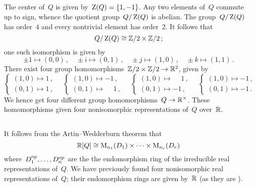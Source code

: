 \subsection{}

The center of~$Q$ is given by~$\operatorname{Z}(Q) = \{1, -1\}$.
Any two elements of~$Q$ commute up to sign, whence the quotient group~$Q/\operatorname{Z}(Q)$ is abelian.
The group~$Q/\operatorname{Z}(Q)$ has order~$4$ and every nontrivial element has order~$2$.
It follows that
\[
  Q/\operatorname{Z}(Q)
  \cong
  \mathbb{Z}/2 \times \mathbb{Z}/2  \,;
\]
one such isomorphism is given by
\[
  \pm 1 \mapsto (0,0) \,, \quad
  \pm i \mapsto (0,1) \,, \quad
  \pm j \mapsto (1,0) \,, \quad
  \pm k \mapsto (1,1) \,.
\]
There exist four group homomorphisms~$\mathbb{Z}/2 \times \mathbb{Z}/2 \to \mathbb{R}^2$, given by
\[
  \begin{cases}
    (1,0) \mapsto 1 \,, \\
    (0,1) \mapsto 1 \,,
  \end{cases}
  \quad
  \begin{cases}
    (1,0) \mapsto           -1  \,, \\
    (0,1) \mapsto \phantom{-}1  \,,
  \end{cases}
  \quad
  \begin{cases}
    (1,0) \mapsto \phantom{-}1  \,, \\
    (0,1) \mapsto           -1  \,,
  \end{cases}
  \quad
  \begin{cases}
    (1,0) \mapsto -1  \,, \\
    (0,1) \mapsto -1  \,.
  \end{cases}
  \quad
\]
We hence get four different group homomorphisms~$Q \to \mathbb{R}^\times$.
These homomorphisms given four nonisomorphic  representations of~$Q$ over~$\mathbb{R}$.





\subsection{}


It follows from the Artin--Wedderburn theorem that
\begin{equation}
  \label{RQ decomposition}
  \mathbb{R}[Q]
  \cong
  \operatorname{M}_{n_1}(D_1) \times \dotsb \times \operatorname{M}_{n_r}(D_r)
\end{equation}
where~$D_1^{\mathrm{op}}, \dotsc, D_n^{\mathrm{op}}$ are the the endomorphism ring of the irreducible real representations of~$Q$.
We have previously found four nonisomorphic  real representations of~$Q$;
their endomorphism rings are given by~$\mathbb{R}$ (as they are ).

